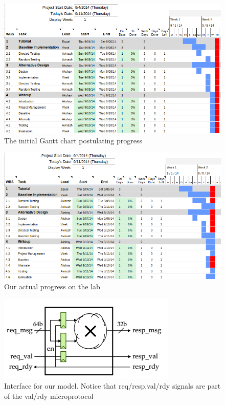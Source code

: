 \documentclass[11pt]{article}
\begin{document}
\begin{figure}[b]
\centering
\includegraphics[scale=0.5]{gantt}
\caption{The initial Gantt chart postulating progress}
\label{fig:gantt}
\end{figure}

\begin{figure}[b]
\centering
\includegraphics[scale=0.5]{gantt_actual}
\caption{Our actual progress on the lab}
\label{fig:gantt_actual}
\end{figure}

\begin{figure}[b]
\centering
\includegraphics[scale=0.5]{FLmodel}
\caption{Interface for our model. Notice that req/resp,val/rdy signals are part of the val/rdy microprotocol}
\label{fig:model}
\end{figure}
\end{document}
